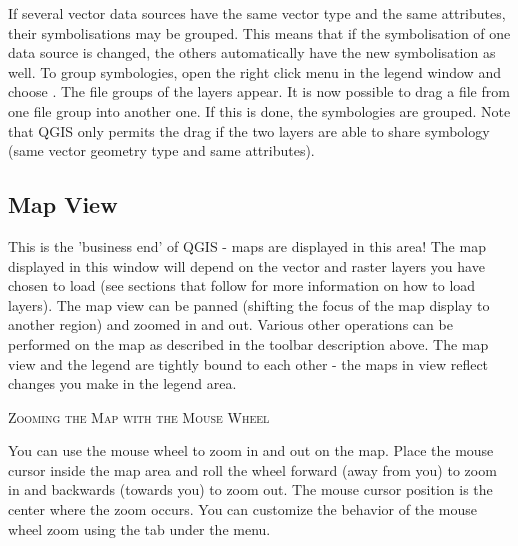 If several vector data sources have the same vector type and the same
attributes, their symbolisations may be grouped. This means that if the
symbolisation of one data source is changed, the others automatically have
the new symbolisation as well. To group symbologies, open the right click
menu in the legend window and choose . The file
groups of the layers appear. It is now possible to drag a file from one file
group into another one. If this is done, the symbologies are grouped. Note
that QGIS only permits the drag if the two layers are able to share
symbology (same vector geometry type and same attributes).

%

\subsection{Map View}\label{label_mapview}

This is the 'business end' of QGIS - maps are displayed in this area! The
map displayed in this window will depend on the vector and raster layers you
have chosen to load (see sections that follow for more information on how to
load layers). The map view can be panned (shifting the focus of the map display
to another region) and zoomed in and out. Various other operations can be
performed on the map as described in the toolbar description above.  The map
view and the legend are tightly bound to each other - the maps in view reflect
changes you make in the legend area.

\begin{Tip}\caption{\textsc{Zooming the Map with the Mouse
Wheel}}
You can use the mouse wheel to zoom in and out on the map. Place
the mouse cursor inside the map area and roll the wheel forward (away from you) to
zoom in and backwards (towards you) to zoom out. The mouse cursor position is the
center where the zoom occurs. You can customize the behavior of the mouse
wheel zoom using the  tab under the  \arrow
{} menu.
\end{Tip}


